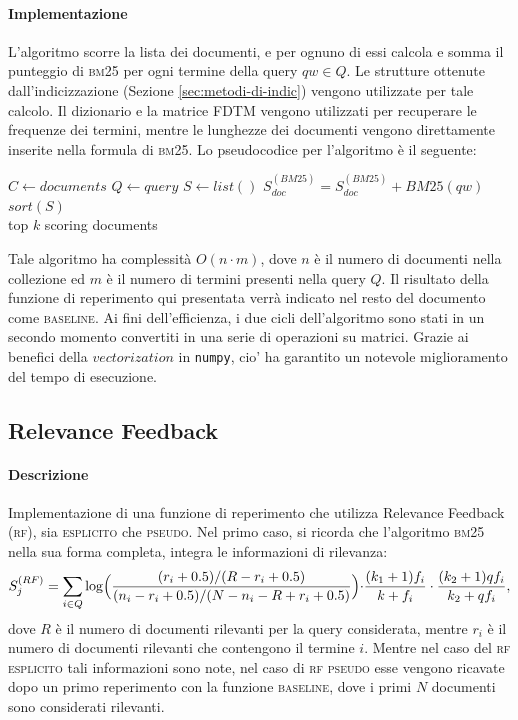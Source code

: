 \paragraph{\textbf{Implementazione}}
L'algoritmo scorre la lista dei documenti, e per ognuno di essi calcola e somma il punteggio di \textsc{bm25} per ogni termine della query $qw \in Q$. Le strutture ottenute dall'indicizzazione (Sezione \ref{sec:metodi-di-indic}) vengono utilizzate per tale calcolo. Il dizionario e la matrice FDTM vengono utilizzati per recuperare le frequenze dei termini, mentre le lunghezze dei documenti vengono direttamente inserite nella formula di \textsc{bm25}. Lo pseudocodice per l'algoritmo \`e il seguente:
\begin{algorithmic}
\State $C \gets documents$
\State $Q \gets query$
\State $S \gets list()$
		\State $S^{(BM25)}_{doc} = S^{(BM25)}_{doc} + BM25(qw)$
	\EndFor
\EndFor
\State $sort(S)$\\
\Return top $k$ scoring documents
\end{algorithmic}
Tale algoritmo ha complessit\`a $O(n \cdot m)$, dove $n$ \`e il numero di documenti nella collezione ed $m$ \`e il numero di termini presenti nella query $Q$. Il risultato della funzione di reperimento qui presentata verr\`a indicato nel resto del documento come \textsc{baseline}. Ai fini dell'efficienza, i due cicli dell'algoritmo sono stati in un secondo momento convertiti in una serie di operazioni su matrici. Grazie ai benefici della $vectorization$ in \texttt{numpy}, cio' ha garantito un notevole miglioramento del tempo di esecuzione.
\subsection{Relevance Feedback}
\label{sec:relevance-feedback}

\paragraph{\textbf{Descrizione}}
Implementazione di una funzione di reperimento che utilizza Relevance Feedback (\textsc{rf}), sia \textsc{esplicito} che \textsc{pseudo}. Nel primo caso, si ricorda che l'algoritmo \textsc{bm25} nella sua forma completa, integra le informazioni di rilevanza:
\[ S^{(RF)}_j = \sum\limits_{i \in Q}\log\Bigl(\frac{(r_i+0.5)/(R-r_i+0.5)}{(n_i-r_i+0.5)/(N-n_i-R+r_i+0.5)}\Bigl)\cdot\frac{(k_1+1)f_i}{k+f_i}\cdot\frac{(k_2+1)qf_i}{k_2+qf_i}, \]
dove $R$ \`e il numero di documenti rilevanti per la query considerata, mentre $r_i$ \`e il numero di documenti rilevanti che contengono il termine $i$. Mentre nel caso del \textsc{rf esplicito} tali informazioni sono note, nel caso di \textsc{rf pseudo} esse vengono ricavate dopo un primo reperimento con la funzione \textsc{baseline}, dove i primi $N$ documenti sono considerati rilevanti.

